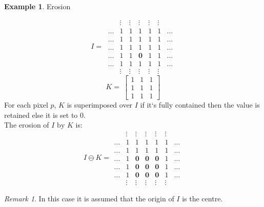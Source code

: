 \documentclass{article}
\theoremstyle{definition}
\newtheorem{ex}{Example}[subsection]
\theoremstyle{remark}
\newtheorem*{rem}{Remark}
\begin{document}
\begin{ex} Erosion

\begin{equation*}
    I =\  \begin{matrix}
	& \vdots  & \vdots & \vdots  & \vdots & \vdots \\
	\dots & 1 & 1 & 1 & 1 & 1 & \dots \\
	\dots & 1 & 1 & 1 & 1 & 1 & \dots \\
	\dots & 1 & 1 & 1 & 1 & 1 & \dots \\
	\dots & 1 & 1 & \pmb{0} & 1 & 1 & \dots \\
	\dots & 1 & 1  & 1  & 1  & 1 & \dots \\
	& \vdots  & \vdots & \vdots  & \vdots & \vdots 
    \end{matrix}
\end{equation*}
\begin{equation*}
    K =\ \begin{bmatrix}
	1 & 1 & 1 \\
	1 & 1 & 1 \\
	1 & 1 & 1  
    \end{bmatrix}
\end{equation*}
For each pixel $ p $, $ K $ is superimposed over $ I $ if it`s fully contained then the value is retained else it is set to $ 0 $.\\

\noindent The erosion of $ I \text{ by } K $ is:
\begin{equation*}
    I \ominus K = \begin{matrix}
	& \vdots  & \vdots & \vdots  & \vdots & \vdots \\
	\dots & 1 & 1 & 1 & 1 & 1 & \dots \\
	\dots & 1 & 1 & 1 & 1 & 1 & \dots \\
	\dots & 1 & \pmb{0} & \pmb{0} & \pmb{0} & 1 & \dots \\
	\dots & 1 & \pmb{0} & \pmb{0} & \pmb{0} & 1 & \dots \\
	\dots & 1 & \pmb{0} & \pmb{0} & \pmb{0} & 1 & \dots \\
	& \vdots  & \vdots & \vdots  & \vdots & \vdots 
    \end{matrix}
\end{equation*}
\end{ex}

\begin{rem}
    In this case it is assumed that the origin of $ I $ is the centre.\\
\end{rem}
\end{document}
